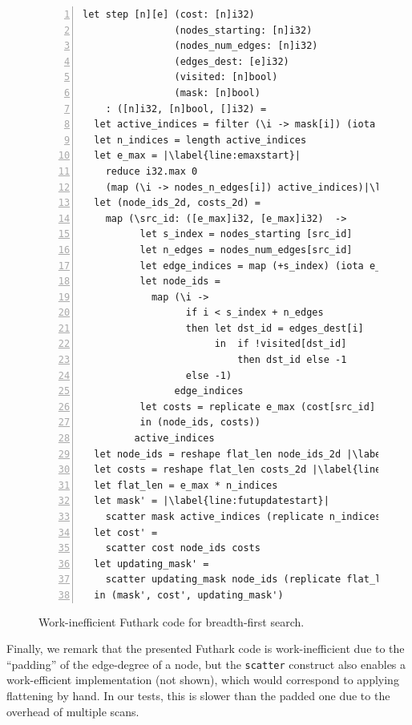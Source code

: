 \begin{figure}[ht]
\small
\begin{lstlisting}[language=futhark,numbers=left,escapechar=|]
let step [n][e] (cost: [n]i32)
                (nodes_starting: [n]i32)
                (nodes_num_edges: [n]i32)
                (edges_dest: [e]i32)
                (visited: [n]bool)
                (mask: [n]bool)
    : ([n]i32, [n]bool, []i32) =
  let active_indices = filter (\i -> mask[i]) (iota n)|\label{line:futfilter}|
  let n_indices = length active_indices
  let e_max = |\label{line:emaxstart}|
    reduce i32.max 0
    (map (\i -> nodes_n_edges[i]) active_indices)|\label{line:emaxend}|
  let (node_ids_2d, costs_2d) =
    map (\src_id: ([e_max]i32, [e_max]i32)  ->
          let s_index = nodes_starting [src_id]
          let n_edges = nodes_num_edges[src_id]
          let edge_indices = map (+s_index) (iota e_max)
          let node_ids =
            map (\i ->
                  if i < s_index + n_edges
                  then let dst_id = edges_dest[i]
                       in  if !visited[dst_id]
                           then dst_id else -1
                  else -1)
                edge_indices
          let costs = replicate e_max (cost[src_id] + 1)
          in (node_ids, costs))
         active_indices
  let node_ids = reshape flat_len node_ids_2d |\label{line:futflatstart}|
  let costs = reshape flat_len costs_2d |\label{line:futflatend}|
  let flat_len = e_max * n_indices
  let mask' = |\label{line:futupdatestart}|
    scatter mask active_indices (replicate n_indices false)
  let cost' =
    scatter cost node_ids costs
  let updating_mask' =
    scatter updating_mask node_ids (replicate flat_len true) |\label{line:futupdateend}|
  in (mask', cost', updating_mask')
\end{lstlisting}
  \caption{Work-inefficient Futhark code for breadth-first search.}
  \label{fig:bfs-fun-pad}
\end{figure}

Finally, we remark that the presented Futhark code is work-inefficient
due to the ``padding'' of the edge-degree of a node, but the
\lstinline{scatter} construct also enables a work-efficient
implementation (not shown), which would correspond to applying
flattening by hand. In our tests, this is slower than the padded one
due to the overhead of multiple scans.
%

